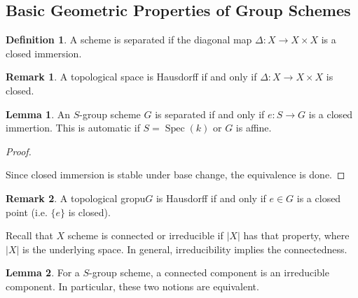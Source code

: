 \documentclass[10pt]{article}
\numberwithin{equation}{section}
\theoremstyle{definition}
\newtheorem{definition}{Definition}[section]
\newtheorem{lemma}{Lemma}[section]
\newtheorem{remark}{Remark}[section]
\DeclareMathOperator{\id}{id}
\DeclareMathOperator{\Spec}{Spec}
\newcommand{\ab}[1]{\vert #1 \vert}
\newcommand{\fib}[1]{%
  \mathbin{\mathop{\times}\limits_{#1}}%
}
\begin{document}
\subsection{Basic Geometric Properties of Group Schemes}
\begin{definition}
    A scheme is separated if the diagonal map $\Delta:X\to X\times X$ is a closed immersion.
\end{definition}
\begin{remark}
    A topological space is Hausdorff if and only if $\Delta:X\to X\times X$ is closed. 
\end{remark}
\begin{lemma}
    \label{lemma_12}
    An $S$-group scheme $G$ is separated if and only if $e:S\to G$ is a closed immertion. This is automatic if $S = \Spec(k)$ or $G$ is affine.
\end{lemma}
\begin{proof}$\:$
    \begin{center}
    \end{center}
    Since closed immersion is stable under base change, the equivalence is done.
\end{proof}
\begin{remark}
    A topological gropu$G$ is Hausdorff if and only if $e\in G$ is a closed point (i.e. $\{e\}$ is closed).
\end{remark}
Recall that $X$ scheme is connected or irreducible if $\ab{X}$ has that property, where $\ab{X}$ is the underlying space. In general, irreducibility implies the connectedness. 
\begin{lemma}
    \label{lemma_13}
    For a $S$-group scheme, a connected component is an irreducible component. In particular, these two notions are equivalent.
\end{lemma}
\end{document}
